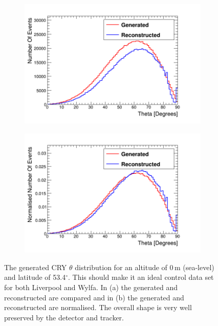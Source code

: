 \begin{figure}[!h]
\centering
\begin{subfigure}{.5\textwidth}
  \centering
  \includegraphics[width=\linewidth]{Chapter6/Figs/thetaGenRecoCry.png}
  \captionsetup{width=.9\linewidth}
  \caption{}
  \label{subFig:thetaGenRecoCry}
\end{subfigure}%
\begin{subfigure}{.5\textwidth}
  \centering
\includegraphics[width=\linewidth]{Chapter6/Figs/thetaGenRecoCryNorm.png}
  \captionsetup{width=.9\linewidth}
  \caption{}
  \label{subFig:thetaGenRecoCryNorm}
\end{subfigure}
\caption{The generated CRY $\theta$ distribution for an altitude of 0\,m (sea-level) and latitude of 53.4$^\circ$. This should make it an ideal control data set for both Liverpool and Wylfa. In (a) the generated and reconstructed are compared and in (b) the generated and reconstructed are normalised. The overall shape is very well preserved by the detector and tracker.}
\label{fig:thetaGenRecoCryAndNorm}
\end{figure}

